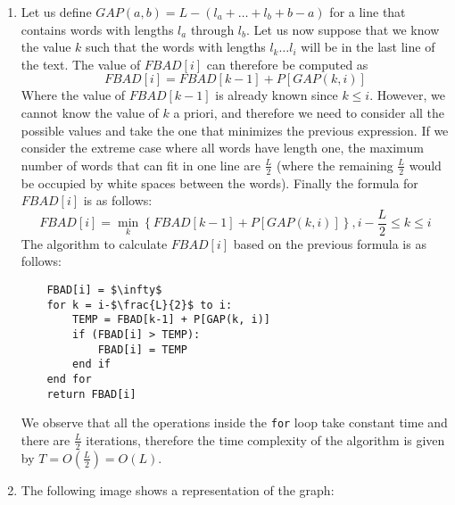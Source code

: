\documentclass{article}
\begin{document}
\begin{enumerate}[1.]

    \item Let us define $GAP(a,b) = L - (l_a + \ldots + l_b + b - a)$ for a line that contains words with lengths $l_a$ through $l_b$. Let us now suppose that we know the value $k$ such that the words with lengths $l_k \ldots l_i$ will be in the last line of the text. The value of $FBAD[i]$ can therefore be computed as
    \begin{equation*}
        FBAD[i] = FBAD[k-1] + P[GAP(k, i)]
    \end{equation*}
    Where the value of $FBAD[k-1]$ is already known since $k \leq i$. However, we cannot know the value of $k$ a priori, and therefore we need to consider all the possible values and take the one that minimizes the previous expression. If we consider the extreme case where all words have length one, the maximum number of words that can fit in one line are $\frac{L}{2}$ (where the remaining $\frac{L}{2}$ would be occupied by white spaces between the words). Finally the formula for $FBAD[i]$ is as follows:
    \begin{equation*}
        FBAD[i] = \min_{k}\left\{FBAD[k-1] + P[GAP(k, i)]\right\}, i-\frac{L}{2} \leq k \leq i
    \end{equation*}
    The algorithm to calculate $FBAD[i]$ based on the previous formula is as follows:
\begin{lstlisting}
    FBAD[i] = $\infty$
    for k = i-$\frac{L}{2}$ to i:
        TEMP = FBAD[k-1] + P[GAP(k, i)]
        if (FBAD[i] > TEMP):
            FBAD[i] = TEMP
        end if
    end for
    return FBAD[i]
\end{lstlisting}
    We observe that all the operations inside the \texttt{for} loop take constant time and there are $\frac{L}{2}$ iterations, therefore the time complexity of the algorithm is given by $T = O\left(\frac{L}{2}\right) = O(L)$.

    \item The following image shows a representation of the graph:
    \begin{center}
\end{center}
\end{enumerate}
\end{document}
